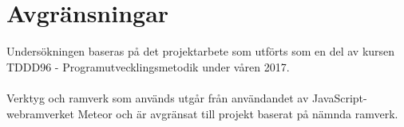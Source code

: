 





\section{Avgränsningar}
\label{sec:delimitations}
Undersökningen baseras på det projektarbete som utförts som en del av kursen TDDD96 - Programutvecklingsmetodik under våren 2017.\\
\\
Verktyg och ramverk som används utgår från användandet av JavaScript-webramverket Meteor och är avgränsat till projekt baserat på nämnda ramverk. 





